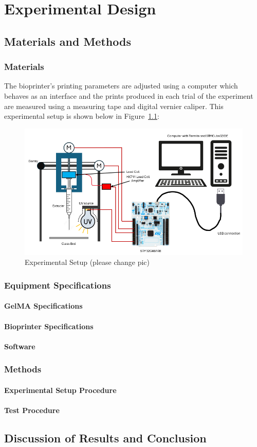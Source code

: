 \chapter{Experimental Design}

\section{Materials and Methods}
\subsection{Materials}
The bioprinter’s printing parameters are adjusted using a computer which behaves as an interface and the prints produced in each trial of the experiment are measured using a measuring tape and digital vernier caliper. This experimental setup is shown below in Figure~\ref{fig:experimentalSetup}:
 \begin{figure}[h]
    \centering
    \includegraphics[scale=0.7]{figs/ExperimentalSetup.png}
    \caption{Experimental Setup (please change pic)}
    \label{fig:experimentalSetup}
\end{figure}
\subsection{Equipment Specifications}
\subsubsection*{GelMA Specifications}
\subsubsection*{Bioprinter Specifications}
\subsubsection*{Software}
\subsection{Methods}
\subsubsection*{Experimental Setup Procedure}
\subsubsection*{Test Procedure}
\section{Discussion of Results and Conclusion}